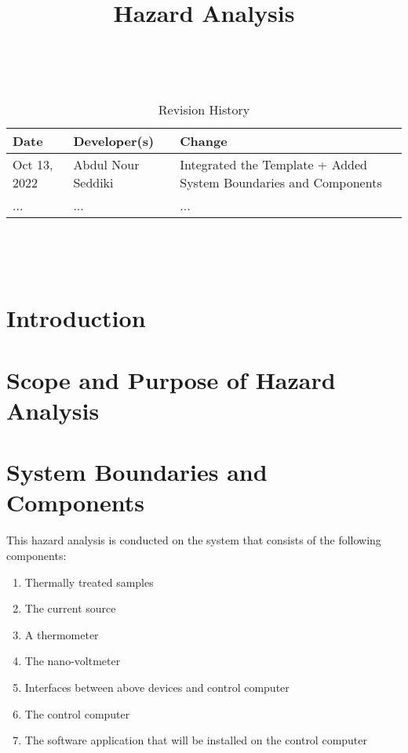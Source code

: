 \documentclass{article}
\title{Hazard Analysis\\\progname}
\author{\authname}
\date{}
\begin{document}
\maketitle
\thispagestyle{empty}

~\newpage


\begin{table}[hp]
\caption{Revision History} \label{TblRevisionHistory}
\begin{tabularx}{\textwidth}{llX}
\toprule
\textbf{Date} & \textbf{Developer(s)} & \textbf{Change}\\
\midrule
Oct 13, 2022 & Abdul Nour Seddiki & Integrated the Template + Added System Boundaries and Components\\
... & ... & ...\\
\bottomrule
\end{tabularx}
\end{table}

~\newpage

\tableofcontents

~\newpage



\section{Introduction}


\section{Scope and Purpose of Hazard Analysis}

\section{System Boundaries and Components}

\noindent This hazard analysis is conducted on the system that consists of the following components:

\begin{enumerate}
  \item Thermally treated samples
  \item The current source
  \item A thermometer
  \item The nano-voltmeter
  \item Interfaces between above devices and control computer
  \item The control computer
  \item The software application that will be installed on the control computer
\end{enumerate}
\end{document}
